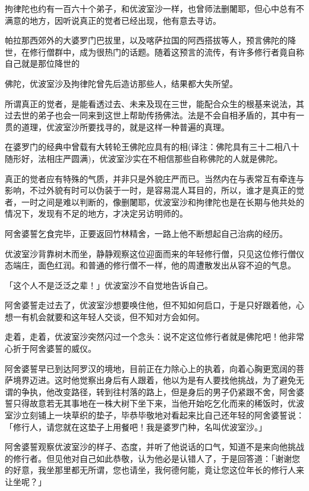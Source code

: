 \documentclass[twoside,openany]{book}
\begin{document}
拘律陀也约有一百六十个弟子，和优波室沙一样，也曾师法删闍耶，但心中总有不满意的地方，因听说真正的觉者已经出现，他有意去寻访。

帕拉那西郊外的大婆罗门巴拔里，以及喀萨拉国的阿西搭拔等人，预言佛陀的降世，在修行僧群中，成为很热门的话题。随着这预言的流传，有许多修行者竟自称自己就是那位降世的

佛陀，优波室沙及拘律陀曾先后造访那些人，结果都大失所望。

所谓真正的觉者，是能看透过去、未来及现在三世，能配合众生的根基来说法，其过去世的弟子也会一同来到这世上帮助传扬佛法。法是不会自相矛盾的，其中有一贯的道理，优波室沙所要找寻的，就是这样一种普遍的真理。

在婆罗门的经典中曾载有大转轮王佛陀应具有的相({\kaishu 译注：佛陀具有三十二相八十随形好，法相庄严圆满})，优波室沙实在不相信那些自称佛陀的人就是佛陀。

真正的觉者应有特殊的气质，并非只是外貌庄严而已。当然内在与表常互有牵连与影响，不过外貌有时可以伪装于一时，是容易混人耳目的，所以，谁才是真正的觉者，一时之间是难以判断的，像删闍耶，优波室沙和拘律陀也是在长期与他共处的情况下，发现有不足的地方，才决定另访明师的。

阿舍婆誓乞食完毕，正要返回竹林精舍，一路上他不断想起自己治病的经历。

优波室沙背靠树木而坐，静静观察这位迎面而来的年轻修行僧，只见这位修行僧仪态端庄，面色红润。和普通的修行僧不一样，他的周遭散发出从容不迫的气息。

「这个人不是泛泛之辈！」优波室沙不自觉地告诉自己。

阿舍婆誓走过去了，优波室沙想要唤住他，但不知如何启口，于是只好跟着他，心想一有机会就要和这年轻人交谈，但不知对方会如何。

走着，走着，优波室沙突然闪过一个念头：说不定这位修行者就是佛陀吧！他非常心折于阿舍婆誓的威仪。

阿舍婆誓早已到达阿罗汉的境地，目前正在力除心上的执着，向着心胸更宽阔的菩萨境界迈进。这时他觉察出身后有人跟着，他以为是有人要找他挑战，为了避免无谓的争执，他改变路径，转到往村落的路上，但是身后的男子仍紧跟不舍，阿舍婆誓只得故意若无其事地在一株大树下坐下来，当他开始吃乞化而来的稀饭时，优波室沙立刻铺上一块草织的垫子，毕恭毕敬地对看起来比自己还年轻的阿舍婆誓说：「修行人，请您就在这垫子上用餐吧！我是婆罗门种，名叫优波室沙。」

阿舍婆誓观察优波室沙的样子、态度，并听了他说话的口气，知道不是来向他挑战的修行者。但见他对自己如此恭敬，认为他必是认错人了，于是回答道：「谢谢您的好意，我坐那里都无所谓，您也请坐，我何德何能，竟让您这位年长的修行人来让坐呢？」
\end{document}
